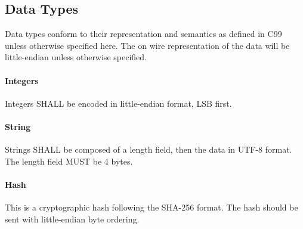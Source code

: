 \documentclass[12pt]{article}
\begin{document}
\subsection{Data Types}
Data types conform to their representation and semantics as defined in C99 unless
otherwise specified here. The on wire representation of the data will be
little-endian unless otherwise specified.
\paragraph{Integers} Integers SHALL be encoded in little-endian format, LSB first.
\paragraph{String} Strings SHALL be composed of a length field, then the data in UTF-8 format. The
length field MUST be 4 bytes.
\paragraph{Hash} This is a cryptographic hash following the SHA-256 format. The
hash should be sent with little-endian byte ordering.
\end{document}
